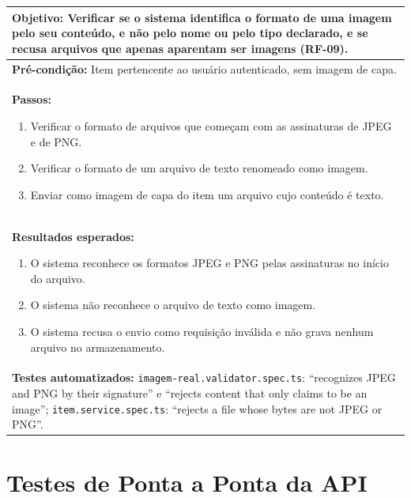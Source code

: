 \FloatBarrier
\begin{quadro}[h!]
\caption{Caso de teste CT08: validar o formato real da imagem enviada}
\label{quad:ct08}
\begin{tabular}{|p{\dimexpr\linewidth-2\tabcolsep-2\arrayrulewidth\relax}|}
\hline
\textbf{Objetivo:} Verificar se o sistema identifica o formato de uma imagem pelo seu conteúdo, e não pelo nome ou pelo tipo declarado, e se recusa arquivos que apenas aparentam ser imagens (RF-09). \\ \hline
\textbf{Pré-condição:} Item pertencente ao usuário autenticado, sem imagem de capa. \\ \hline
\textbf{Passos:}
\begin{enumerate}[nosep,leftmargin=1.2em,topsep=2pt,partopsep=0pt,parsep=0pt,itemsep=1pt]
  \item Verificar o formato de arquivos que começam com as assinaturas de JPEG e de PNG.
  \item Verificar o formato de um arquivo de texto renomeado como imagem.
  \item Enviar como imagem de capa do item um arquivo cujo conteúdo é texto.
\end{enumerate} \\ \hline
\textbf{Resultados esperados:}
\begin{enumerate}[nosep,leftmargin=1.2em,topsep=2pt,partopsep=0pt,parsep=0pt,itemsep=1pt]
  \item O sistema reconhece os formatos JPEG e PNG pelas assinaturas no início do arquivo.
  \item O sistema não reconhece o arquivo de texto como imagem.
  \item O sistema recusa o envio como requisição inválida e não grava nenhum arquivo no armazenamento.
\end{enumerate} \\ \hline
\textbf{Testes automatizados:} \texttt{imagem-real.validator.spec.ts}: ``recognizes JPEG and PNG by their signature'' e ``rejects content that only claims to be an image''; \texttt{item.service.spec.ts}: ``rejects a file whose bytes are not JPEG or PNG''. \\ \hline
\end{tabular}
\end{quadro}
\FloatBarrier

\section{Testes de Ponta a Ponta da API}
\label{sec:testesPontaAPonta}

